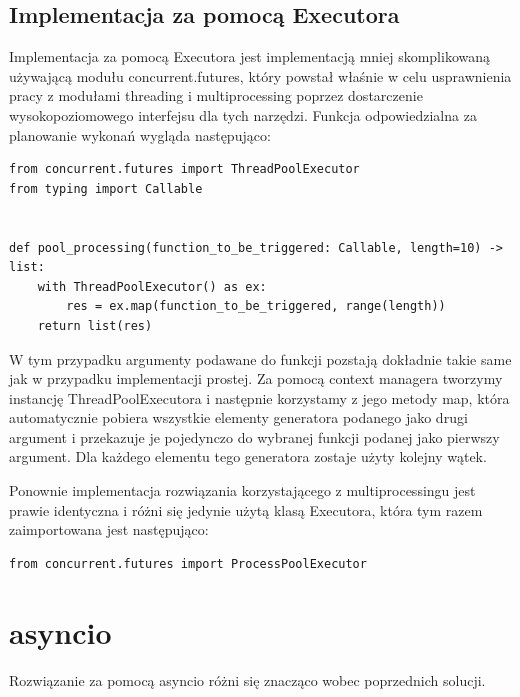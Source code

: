 \subsection{Implementacja za pomocą Executora}
Implementacja za pomocą Executora jest implementacją mniej skomplikowaną używającą modułu concurrent.futures, który powstał właśnie w celu usprawnienia pracy z modułami threading i multiprocessing poprzez dostarczenie wysokopoziomowego interfejsu dla tych narzędzi.
Funkcja odpowiedzialna za planowanie wykonań wygląda następująco:
\begin{lstlisting}
from concurrent.futures import ThreadPoolExecutor
from typing import Callable


def pool_processing(function_to_be_triggered: Callable, length=10) -> list:
    with ThreadPoolExecutor() as ex:
        res = ex.map(function_to_be_triggered, range(length))
    return list(res)
\end{lstlisting}
W tym przypadku argumenty podawane do funkcji pozstają dokładnie takie same jak w przypadku implementacji prostej. Za pomocą context managera tworzymy instancję ThreadPoolExecutora i następnie korzystamy z jego metody map, która automatycznie pobiera wszystkie elementy generatora podanego jako drugi argument i przekazuje je pojedynczo do wybranej funkcji podanej jako pierwszy argument. Dla każdego elementu tego generatora zostaje użyty kolejny wątek.

Ponownie implementacja rozwiązania korzystającego z multiprocessingu jest prawie identyczna i różni się jedynie użytą klasą Executora, która tym razem zaimportowana jest następująco:
\begin{lstlisting}
from concurrent.futures import ProcessPoolExecutor
\end{lstlisting}

\section{asyncio}
Rozwiązanie za pomocą asyncio różni się znacząco wobec poprzednich solucji. 

\newpage
